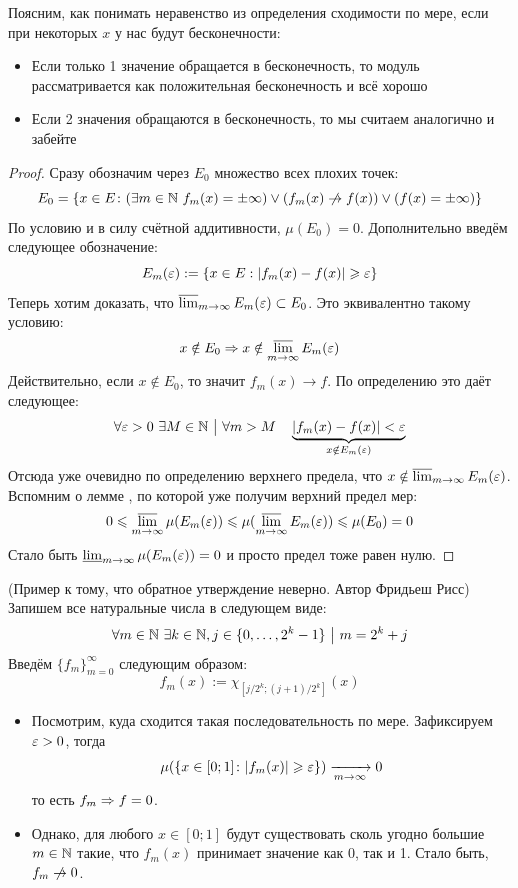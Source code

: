 \begin{note}
	Поясним, как понимать неравенство из определения сходимости по мере, если при некоторых $x$ у нас будут бесконечности:
	\begin{itemize}
		\item Если только 1 значение обращается в бесконечность, то модуль рассматривается как положительная бесконечность и всё хорошо
		
		\item Если 2 значения обращаются в бесконечность, то мы считаем аналогично и забейте
	\end{itemize}
\end{note}

\begin{proof}
	Сразу обозначим через $E_0$ множество всех плохих точек:
	\[
		E_0 = \{x \in E \colon (\exists m \in \N\ f_m(x) = \pm\infty) \vee (f_m(x) \centernot\to f(x)) \vee (f(x) = \pm\infty)\}
	\]
	По условию и в силу счётной аддитивности, $\mu(E_0) = 0$. Дополнительно введём следующее обозначение:
	\[
		E_m(\varepsilon) := \{x \in E : |f_m(x) - f(x)| \geqslant \varepsilon\}
	\]
	Теперь хотим доказать, что $\varlimsup_{m \to \infty} E_m(\varepsilon) \subset E_0$. Это эквивалентно такому условию:
	\[
		x \notin E_0 \Rightarrow x \notin \varlimsup_{m \to \infty} E_m(\varepsilon)
	\]
	Действительно, если $x \notin E_0$, то значит $f_m(x) \to f$. По определению это даёт следующее:
	\[
		\forall \varepsilon > 0\ \exists M \in \mathbb{N} \ \big|\  \forall m > M \quad \underbrace{|f_m(x) - f(x)| < \varepsilon}_{x \notin E_m(\varepsilon)}
	\]
	Отсюда уже очевидно по определению верхнего предела, что $x \notin \varlimsup_{m \to \infty} E_m(\varepsilon)$. Вспомним о лемме \label{lem1}, по которой уже получим верхний предел мер:
	\[
		0 \leqslant \varlimsup_{m \to \infty} \mu(E_m(\varepsilon)) \leqslant \mu(\varlimsup_{m \to \infty} E_m(\varepsilon)) \leqslant \mu(E_0) = 0
	\]
	Стало быть $\varliminf_{m \to \infty} \mu(E_m(\varepsilon)) = 0$ и просто предел тоже равен нулю.
\end{proof}

\begin{example} (Пример к тому, что обратное утверждение неверно. Автор Фридьеш Рисс)
	Запишем все натуральные числа в следующем виде:
	\[
		\forall m \in \mathbb{N}\ \exists k \in \mathbb{N}, j \in \{0, \ldots, 2^k - 1\} \ \big|\  m = 2^k + j
	\]
	Введём $\{f_m\}_{m = 0}^\infty$ следующим образом:
	\[
		f_m(x) := \chi_{[j / 2^k; (j + 1) / 2^k]}(x)
	\]
	\begin{itemize}
		\item Посмотрим, куда сходится такая последовательность по мере. Зафиксируем $\varepsilon > 0$, тогда
		\[
			\mu(\{x \in [0; 1] \colon |f_m(x)| \geqslant \varepsilon\}) \xrightarrow[m \to \infty]{} 0
		\]
		то есть $f_m \Rightarrow f = 0$.
		
		\item Однако, для любого $x \in [0; 1]$ будут существовать сколь угодно большие $m \in \mathbb{N}$ такие, что $f_m(x)$ принимает значение как 0, так и 1. Стало быть, $f_m \centernot\to 0$.
	\end{itemize}
\end{example}


